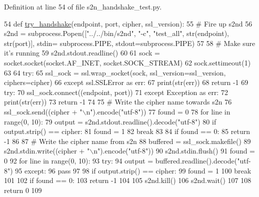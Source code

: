 Definition at line 54 of file s2n\+\_\+handshake\+\_\+test.\+py.


\begin{DoxyCode}
54 \textcolor{keyword}{def }\hyperlink{namespaces2n__handshake__test_a287252556f49081bcdf3a2e0f4168de7}{try\_handshake}(endpoint, port, cipher, ssl\_version):
55     \textcolor{comment}{# Fire up s2nd}
56     s2nd = subprocess.Popen([\textcolor{stringliteral}{"../../bin/s2nd"}, \textcolor{stringliteral}{"-c"}, \textcolor{stringliteral}{"test\_all"}, str(endpoint), str(port)], stdin=
      subprocess.PIPE, stdout=subprocess.PIPE)
57 
58     \textcolor{comment}{# Make sure it's running}
59     s2nd.stdout.readline()
60 
61     sock = socket.socket(socket.AF\_INET, socket.SOCK\_STREAM)
62     sock.settimeout(1)
63 
64     \textcolor{keywordflow}{try}:
65         ssl\_sock = ssl.wrap\_socket(sock, ssl\_version=ssl\_version, ciphers=cipher)
66     \textcolor{keywordflow}{except} ssl.SSLError \textcolor{keyword}{as} err:
67         print(str(err))
68         \textcolor{keywordflow}{return} -1
69     \textcolor{keywordflow}{try}:
70         ssl\_sock.connect((endpoint, port))
71     \textcolor{keywordflow}{except} Exception \textcolor{keyword}{as} err:
72         print(str(err))
73         \textcolor{keywordflow}{return} -1
74 
75     \textcolor{comment}{# Write the cipher name towards s2n}
76     ssl\_sock.send((cipher + \textcolor{stringliteral}{"\(\backslash\)n"}).encode(\textcolor{stringliteral}{"utf-8"}))
77     found = 0
78     \textcolor{keywordflow}{for} line \textcolor{keywordflow}{in} range(0, 10):
79         output = s2nd.stdout.readline().decode(\textcolor{stringliteral}{"utf-8"})
80         \textcolor{keywordflow}{if} output.strip() == cipher:
81             found = 1
82             \textcolor{keywordflow}{break}
83 
84     \textcolor{keywordflow}{if} found == 0:
85         \textcolor{keywordflow}{return} -1
86 
87     \textcolor{comment}{# Write the cipher name from s2n}
88     buffered = ssl\_sock.makefile()
89     s2nd.stdin.write((cipher + \textcolor{stringliteral}{"\(\backslash\)n"}).encode(\textcolor{stringliteral}{"utf-8"}))
90     s2nd.stdin.flush()
91     found = 0
92     \textcolor{keywordflow}{for} line \textcolor{keywordflow}{in} range(0, 10):
93         \textcolor{keywordflow}{try}:
94             output = buffered.readline().decode(\textcolor{stringliteral}{"utf-8"})
95         \textcolor{keywordflow}{except}:
96             \textcolor{keywordflow}{pass}
97 
98         \textcolor{keywordflow}{if} output.strip() == cipher:
99             found = 1
100             \textcolor{keywordflow}{break}
101 
102     \textcolor{keywordflow}{if} found == 0:
103         \textcolor{keywordflow}{return} -1
104 
105     s2nd.kill()
106     s2nd.wait()
107 
108     \textcolor{keywordflow}{return} 0
109 
\end{DoxyCode}


